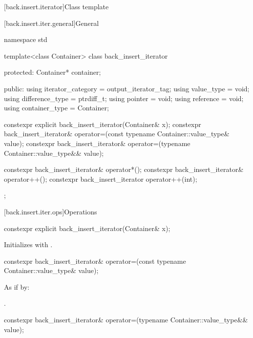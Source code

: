 [back.insert.iterator]{Class template }

[back.insert.iter.general]{General}

%
\begin{codeblock}
namespace std {
  template<class Container>
  class back_insert_iterator {
  protected:
    Container* container;

  public:
    using iterator_category = output_iterator_tag;
    using value_type        = void;
    using difference_type   = ptrdiff_t;
    using pointer           = void;
    using reference         = void;
    using container_type    = Container;

    constexpr explicit back_insert_iterator(Container& x);
    constexpr back_insert_iterator& operator=(const typename Container::value_type& value);
    constexpr back_insert_iterator& operator=(typename Container::value_type&& value);

    constexpr back_insert_iterator& operator*();
    constexpr back_insert_iterator& operator++();
    constexpr back_insert_iterator  operator++(int);
  };
}
\end{codeblock}

[back.insert.iter.ops]{Operations}

%
\begin{itemdecl}
constexpr explicit back_insert_iterator(Container& x);
\end{itemdecl}

\begin{itemdescr}
\pnum
\effects
Initializes
with .
\end{itemdescr}

%
\begin{itemdecl}
constexpr back_insert_iterator& operator=(const typename Container::value_type& value);
\end{itemdecl}

\begin{itemdescr}
\pnum
\effects
As if by: 

\pnum
\returns
{}.
\end{itemdescr}

%
\begin{itemdecl}
constexpr back_insert_iterator& operator=(typename Container::value_type&& value);
\end{itemdecl}

